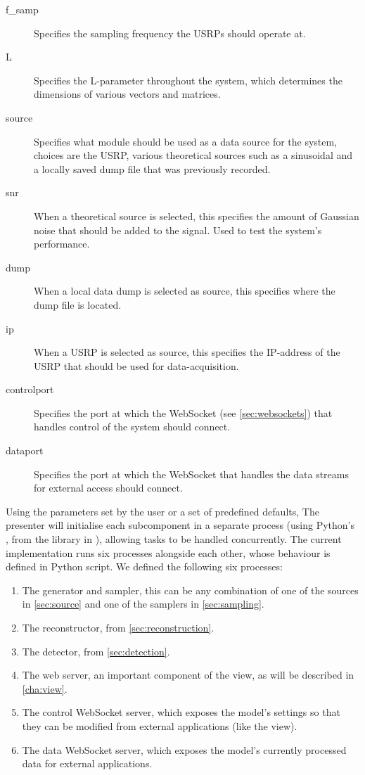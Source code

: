 \documentclass[a4paper, openany, oneside]{memoir}
\begin{document}
\begin{description}
	\item[f\_samp] Specifies the sampling frequency the USRPs should operate at.
	\item[L] Specifies the L-parameter throughout the system, which determines the dimensions of various vectors and matrices.
    \item[source] Specifies what module should be used as a data source for the system, choices are the USRP, various theoretical sources such as a sinusoidal and a locally saved dump file that was previously recorded.
	\item[snr] When a theoretical source is selected, this specifies the amount of Gaussian noise that should be added to the signal. Used to test the system's performance.
	\item[dump] When a local data dump is selected as source, this specifies where the dump file is located.
	\item[ip] When a USRP is selected as source, this specifies the IP-address of the USRP that should be used for data-acquisition.
	\item[controlport] Specifies the port at which the WebSocket (see \cref{sec:websockets}) that handles control of the system should connect.
	\item[dataport] Specifies the port at which the WebSocket that handles the data streams for external access should connect.
\end{description}

Using the parameters set by the user or a set of predefined defaults, The presenter will initialise each subcomponent in a separate process (using Python's , from the  library in \cite{pythonref}), allowing tasks to be handled concurrently. The current implementation runs six processes alongside each other, whose behaviour is defined in  Python script. We defined the following six processes:

\begin{enumerate}
	\item The generator and sampler, this can be any combination of one of the sources in \cref{sec:source} and one of the samplers in \cref{sec:sampling}.
	\item The reconstructor, from \cref{sec:reconstruction}.
	\item The detector, from \cref{sec:detection}.
	\item The web server, an important component of the view, as will be described in \cref{cha:view}.
	\item The control WebSocket server, which exposes the model's settings so that they can be modified from external applications (like the view).
	\item The data WebSocket server, which exposes the model's currently processed data for external applications.
\end{enumerate}
\end{document}

